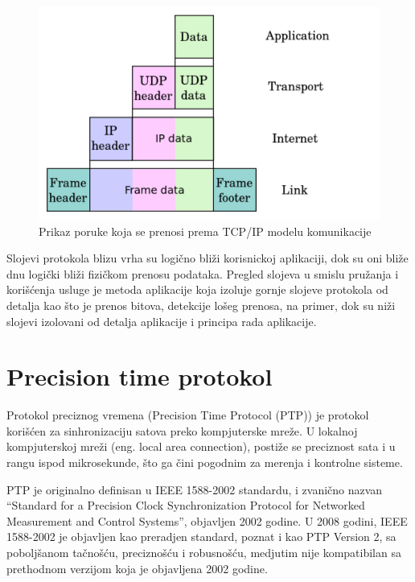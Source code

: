 \documentclass[a4paper,12pt, master]{etf}
\begin{document}
	\begin{figure}[htb]
			\centering
			\includegraphics[scale=.4]{../pic/tcpip_data.png}
			\caption{Prikaz poruke koja se prenosi prema TCP/IP modelu
					komunikacije}
			\label{fig:tcpip_data}
	\end{figure}

	Slojevi protokola blizu vrha su logi\v{c}no bli\v{z}i korisnickoj
	aplikaciji, dok su oni bli\v{z}e dnu logi\v{c}ki bli\v{z}i fizi\v{c}kom
	prenosu podataka. Pregled slojeva u smislu pru\v{z}anja i kori\v{s}\'{c}enja
	usluge je metoda aplikacije koja izoluje gornje slojeve protokola od
	detalja kao \v{s}to je prenos bitova, detekcije lo\v{s}eg prenosa, na
	primer, dok su ni\v{z}i slojevi izolovani od detalja aplikacije i principa
	rada aplikacije.

	\section{Precision time protokol}

    Protokol preciznog vremena (Precision Time Protocol (PTP)) je protokol
	kori\v{s}\'{c}en za sinhronizaciju satova preko kompjuterske mre\v{z}e. U
	lokalnoj kompjuterskoj mre\v{z}i (eng\@. local area connection), posti\v{z}e se
	preciznost sata i u rangu ispod mikrosekunde, \v{s}to ga \v{c}ini pogodnim
	za merenja i kontrolne sisteme.

	PTP je originalno definisan u IEEE 1588-2002 standardu, i zvani\v{c}no
	nazvan ``Standard for a Precision Clock Synchronization Protocol for
	Networked Measurement and Control Systems'', objavljen 2002 godine. U 2008
	godini, IEEE 1588-2002 je objavljen kao preradjen standard, poznat i kao
	PTP Version 2, sa pobolj\v{s}anom ta\v{c}no\v{s}\'{c}u, precizno\v{s}\'{c}u
	i robusno\v{s}\'{c}u, medjutim nije kompatibilan sa prethodnom verzijom
	koja je objavljena 2002 godine.
\end{document}
